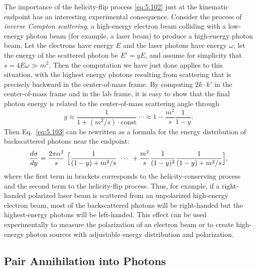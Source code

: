 The importance of the helicity-flip process \eqref{eq:5.102} just at the
kinematic endpoint has an interesting experimental consequence.  Consider the
process of \emph{inverse Compton scattering}, a high-energy electron beam
colliding with a low-energy photon beam (for example, a laser beam) to
produce a high-energy photon beam.  Let the electrons have energy $E$ and the
laser photons have energy $\omega$, let the energy of the scattered photon be
$E' = yE$, and assume for simplicity that $s = 4E\omega \gg m^2$.  Then the
computation we have just done applies to this situation, with the highest
energy photons resulting from scattering that is precisely backward in the
center-of-mass frame.  By computing $2k\cdot k'$ in the center-of-mass frame
and in the lab frame, it is easy to show that the final photon energy is
related to the center-of-mass scattering angle through
\begin{equation}
  y \approx \frac{1}{1 + (m^2/s)\cdot\text{const}}\ \cdots
    \approx 1 - \frac{m^2}{s}\frac{1}{1-y} .
\end{equation}
Then Eq.~\eqref{eq:5.103} can be rewritten as a formula for the energy
distribution of backscattered photons near the endpoint:
\begin{equation}
  \frac{d\sigma}{dy} = \frac{2\pi\alpha^2}{s}\ \Bigl[
    \frac{1}{(1-y)+m^2/s}\ \cdots\ + \frac{m^2}{s}\frac{1}{(1-y)^2}
      \frac{1}{(1-y)+m^2/s} \Bigr] ,
  \label{eq:5.104}
\end{equation}
where the first term in brackets corresponds to the helicity-conserving
process and the second term to the helicity-flip process.  Thus, for example,
if a right-handed polarized laser beam is scattered from an unpolarized
high-energy electron beam, most of the backscattered photons will be
right-handed but the highest-energy photons will be left-handed.  This effect
can be used experimentally to measure the polarization of an electron beam or
to create high-energy photon sources with adjustable energy distribution and
polarization.

\subsection{Pair Annihilation into Photons}

